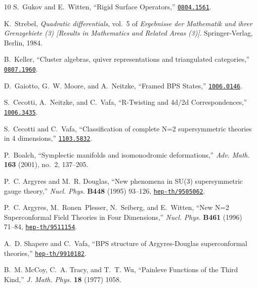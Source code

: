 \begin{thebibliography}{10}
S.~Gukov and E.~Witten, ``{Rigid Surface Operators},''
\href{http://www.arXiv.org/abs/0804.1561}{{\tt 0804.1561}}.

K.~Strebel, {\em Quadratic differentials}, vol.~5 of {\em Ergebnisse der
  Mathematik und ihrer Grenzgebiete (3) [Results in Mathematics and Related
  Areas (3)]}.
\newblock Springer-Verlag, Berlin, 1984.

B.~Keller, ``{C}luster algebras, quiver representations and triangulated
  categories,'' \href{http://www.arXiv.org/abs/0807.1960}{{\tt 0807.1960}}.

D.~Gaiotto, G.~W. Moore, and A.~Neitzke, ``{Framed BPS States},''
\href{http://www.arXiv.org/abs/1006.0146}{{\tt 1006.0146}}.

S.~Cecotti, A.~Neitzke, and C.~Vafa, ``{R-Twisting and 4d/2d
  Correspondences},''
\href{http://www.arXiv.org/abs/1006.3435}{{\tt 1006.3435}}.

S.~Cecotti and C.~Vafa, ``{Classification of complete N=2 supersymmetric
  theories in 4 dimensions},''
\href{http://www.arXiv.org/abs/1103.5832}{{\tt 1103.5832}}.

P.~Boalch, ``Symplectic manifolds and isomonodromic deformations,'' {\em Adv.
  Math.} {\bf 163} (2001), no.~2, 137--205.

P.~C. Argyres and M.~R. Douglas, ``{New phenomena in SU(3) supersymmetric gauge
  theory},'' {\em Nucl. Phys.} {\bf B448} (1995) 93--126,
\href{http://www.arXiv.org/abs/hep-th/9505062}{{\tt hep-th/9505062}}.

P.~C. Argyres, M.~Ronen~Plesser, N.~Seiberg, and E.~Witten, ``{New N=2
  Superconformal Field Theories in Four Dimensions},'' {\em Nucl. Phys.} {\bf
  B461} (1996) 71--84,
\href{http://www.arXiv.org/abs/hep-th/9511154}{{\tt hep-th/9511154}}.

A.~D. Shapere and C.~Vafa, ``{BPS structure of Argyres-Douglas superconformal
  theories},''
\href{http://www.arXiv.org/abs/hep-th/9910182}{{\tt hep-th/9910182}}.

B.~M. McCoy, C.~A. Tracy, and T.~T. Wu, ``{Painleve Functions of the Third
  Kind},'' {\em J. Math. Phys.} {\bf 18} (1977)
1058.


\end{thebibliography}
